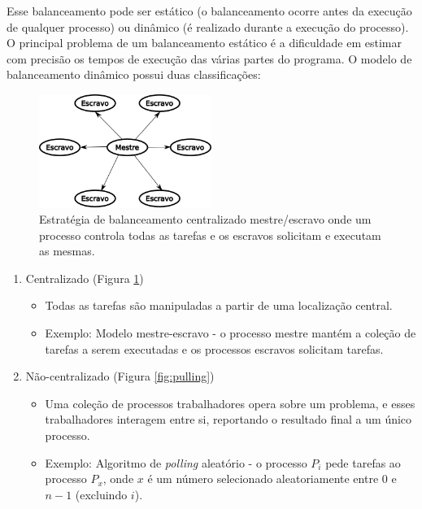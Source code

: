 Esse balanceamento pode ser estático (o balanceamento ocorre antes da execução de qualquer processo) ou dinâmico (é realizado durante a execução do processo). O principal problema de um balanceamento estático é a dificuldade em estimar com precisão os tempos de execução das várias partes do programa. O modelo de balanceamento dinâmico possui duas classificações:

  \begin{figure}[htbp]
     \centering
     \includegraphics[width=0.5\textwidth]{fig/mestre_escravo.png}
     \caption{Estratégia de balanceamento centralizado mestre/escravo onde um processo controla todas as tarefas e os escravos solicitam e executam as mesmas.} 
     \label{fig:mestre_escravo}
 \end{figure}

\begin{enumerate}
 \item Centralizado (Figura \ref{fig:mestre_escravo})
    \begin{itemize}
      \item Todas as tarefas são manipuladas a partir de uma localização central.
      \item Exemplo: Modelo mestre-escravo - o processo mestre mantém a coleção de tarefas a serem executadas e os processos escravos solicitam tarefas.
    \end{itemize}
 
    \item Não-centralizado  (Figura \ref{fig:pulling})
    \begin{itemize}
      \item Uma coleção de processos trabalhadores opera sobre um problema, e esses trabalhadores interagem entre si, reportando o resultado final a um único processo.
      \item Exemplo: Algoritmo de \textit{polling} aleatório - o processo $P_i$ pede tarefas ao processo $P_x$, onde $x$ é um número selecionado aleatoriamente entre $0$ e $n-1$ (excluindo $i$).
    \end{itemize} 
\end{enumerate}


